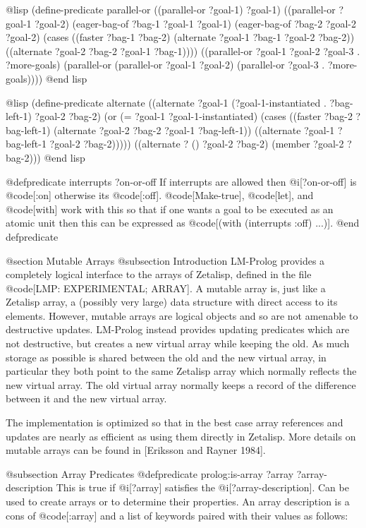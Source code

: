 {@lisp
(define-predicate parallel-or
  ((parallel-or ?goal-1) ?goal-1)
  ((parallel-or ?goal-1 ?goal-2)
   (eager-bag-of ?bag-1 ?goal-1 ?goal-1)
   (eager-bag-of ?bag-2 ?goal-2 ?goal-2)
   (cases ((faster ?bag-1 ?bag-2)
           (alternate ?goal-1 ?bag-1 ?goal-2 ?bag-2))
          ((alternate ?goal-2 ?bag-2 ?goal-1 ?bag-1))))
  ((parallel-or ?goal-1 ?goal-2 ?goal-3 . ?more-goals)
   (parallel-or (parallel-or ?goal-1 ?goal-2)
                (parallel-or ?goal-3 . ?more-goals))))
@end lisp

@lisp
(define-predicate alternate 
  ((alternate ?goal-1 (?goal-1-instantiated . ?bag-left-1)
              ?goal-2 ?bag-2)
   (or (= ?goal-1 ?goal-1-instantiated)
       (cases ((faster ?bag-2 ?bag-left-1)
               (alternate ?goal-2 ?bag-2 ?goal-1 ?bag-left-1))
              ((alternate ?goal-1 ?bag-left-1 ?goal-2 ?bag-2)))))
  ((alternate ? () ?goal-2 ?bag-2)
   (member ?goal-2 ?bag-2)))
@end lisp

@defpredicate interrupts ?on-or-off
If interrupts are allowed then @i[?on-or-off] is @code[:on] otherwise its
@code[:off].  @code[Make-true], @code[let], and @code[with] work with this so that
if one wants a goal to be executed as an atomic unit then this can be
expressed as @code[(with (interrupts :off) ...)].
@end defpredicate

@section Mutable Arrays
@subsection Introduction
LM-Prolog provides a completely logical interface to the arrays of
Zetalisp, defined in the file @code[LMP: EXPERIMENTAL; ARRAY].  A mutable
array is, just like a Zetalisp array, a (possibly very large) data
structure with direct access to its elements.  However, mutable arrays
are logical objects and so are not amenable to destructive updates.
LM-Prolog instead provides updating predicates which are not
destructive, but creates a new virtual array while keeping the old.
As much storage as possible is shared between the old and the new
virtual array, in particular they both point to the same Zetalisp
array which normally reflects the new virtual array.  The old virtual
array normally keeps a record of the difference between it and the new
virtual array.

The implementation is optimized so that in the best case array references and
updates are nearly as efficient as using them directly in Zetalisp.
More details on mutable arrays can be found in [Eriksson and Rayner 1984].

@subsection Array Predicates
@defpredicate prolog:is-array ?array ?array-description
This is true if @i[?array] satisfies the @i[?array-description].
Can be used to create arrays or to determine their properties.
An array description is a cons of @code[:array] and a list of keywords
paired with their values as follows:

}
